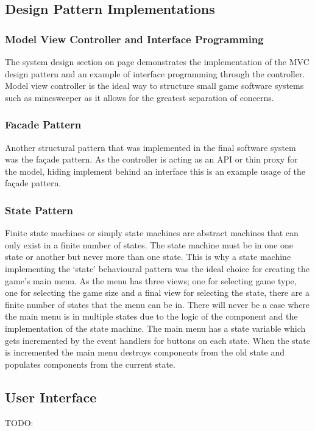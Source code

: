 \documentclass[12pt, a4]{report}
\begin{document}
\subsection{Design Pattern Implementations}
\subsubsection{Model View Controller and Interface Programming}
The system design section on page \pageref{SystemDesign} demonstrates the implementation of the MVC design pattern and an example of interface programming through the controller. Model view controller is the ideal way to structure small game software systems such as minesweeper as it allows for the greatest separation of concerns.

\subsubsection{Facade Pattern}
Another structural pattern that was implemented in the final software system was the façade pattern. As the controller is acting as an API or thin proxy for the model, hiding implement behind an interface this is an example usage of the façade pattern.

\subsubsection{State Pattern}
Finite state machines or simply state machines are abstract machines that can only exist in a finite number of states. The state machine must be in one one state or another but never more than one state. This is why a state machine implementing the `state' behavioural pattern was the ideal choice for creating the game's main menu. As the menu has three views; one for selecting game type, one for selecting the game size and a final view for selecting the state, there are a finite number of states that the menu can be in. There will never be a case where the main menu is in multiple states due to the logic of the component and the implementation of the state machine. The main menu has a state variable which gets incremented by the event handlers for buttons on each state. When the state is incremented the main menu destroys components from the old state and populates components from the current state.

\subsection{User Interface}
TODO:
\end{document}
